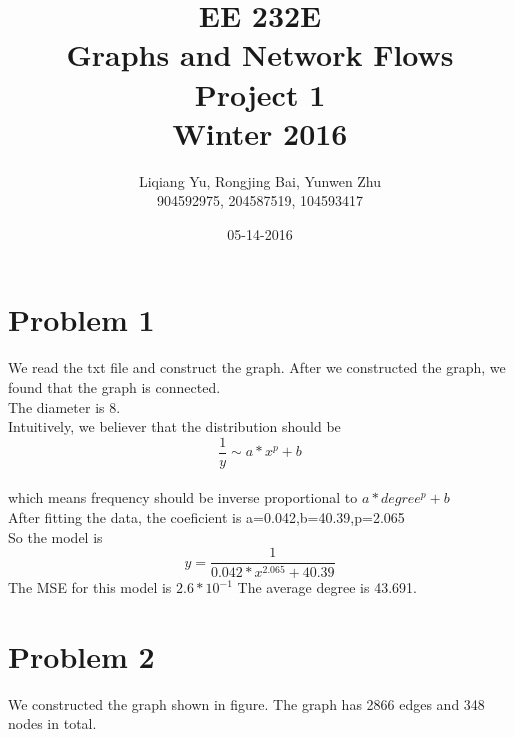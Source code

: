 \documentclass{article}
\begin{document}
\begin{titlepage}
\title{EE 232E \\Graphs and Network Flows\\Project 1\\Winter 2016} 
\author{Liqiang Yu, Rongjing Bai, Yunwen Zhu\\
904592975, 204587519, 104593417}  %
\date{05-14-2016}
\end{titlepage}
\maketitle
\newpage
\tableofcontents
\newpage
\section{Problem 1}
We read the txt file and construct the graph.
After we constructed the graph, we found that the graph is connected.\\
The diameter is 8.\\
Intuitively, we believer that the distribution should be $$\frac{1}{y} \sim a*x^{p}+b$$\\
which means frequency should be inverse proportional  to $a*degree^{p}+b$\\
After fitting the data, the coeficient is a=0.042,b=40.39,p=2.065\\
So the model is $$y=\frac{1}{0.042*x^{2.065}+40.39}$$
The MSE for this model is $2.6*10^{-1}$
The average degree is 43.691.
\section{Problem 2}
We constructed the graph shown in figure. The graph has 2866 edges and 348 nodes in total.
\end{document}

